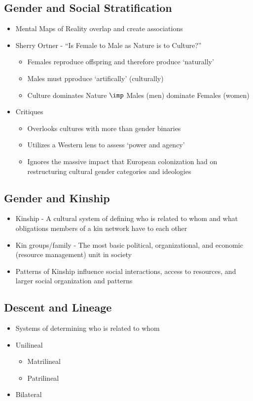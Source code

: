 \documentclass[a4paper]{article}
\begin{document}
\subsection{Gender and Social Stratification} \begin{itemize}
  \item Mental Maps of Reality overlap and create associations
\end{itemize}
\begin{itemize}
  \item Sherry Ortner - ``Is Female to Male as Nature is to Culture?''
  \begin{itemize}
    \item Females reproduce offspring and therefore produce `naturally'
    \item Males must pproduce `artifically' (culturally)
    \item Culture dominates Nature \( \imp \) Males (men) dominate Females (women)
  \end{itemize}
\item Critiques
\begin{itemize}
    \item Overlooks cultures with more than gender binaries
    \item Utilizes a Western lens to assess `power and agency'
    \item Ignores the massive impact that European colonization had on restructuring cultural gender categories and ideologies
  \end{itemize}
\end{itemize}

\subsection{Gender and Kinship}
\begin{itemize}
  \item Kinship - A cultural system of defining who is related to whom and what obligations members of a kin network have to each other
  \item Kin groups/family - The most basic political, organizational, and economic (resource management) unit in society
  \item Patterns of Kinship influence social interactions, access to resources, and larger social organization and patterns
\end{itemize}

\subsection{Descent and Lineage}
\begin{itemize}
  \item Systems of determining who is related to whom
  \item Unilineal \begin{itemize}
    \item Matrilineal
    \item Patrilineal
  \end{itemize}
  \item Bilateral
\end{itemize}
\end{document}
